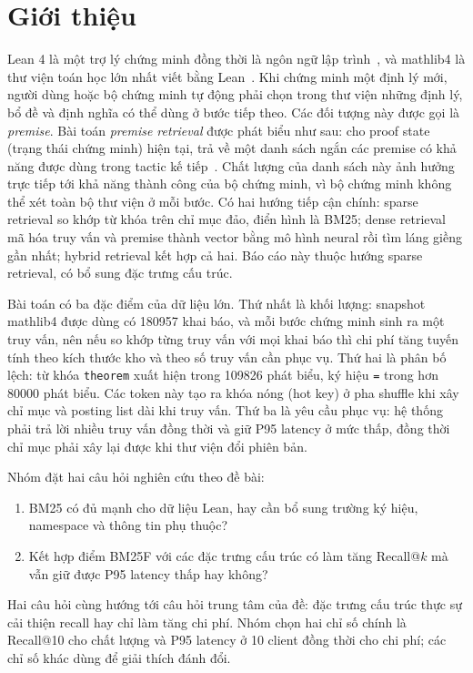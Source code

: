 \documentclass[11pt,a4paper,oneside]{report}
\newcommand{\code}[1]{\texttt{#1}}
\begin{document}
\chapter{Giới thiệu}

Lean 4 là một trợ lý chứng minh đồng thời là ngôn ngữ lập trình~\cite{demoura2021}, và mathlib4 là thư viện toán học
lớn nhất viết bằng Lean~\cite{mathlib2020}. Khi chứng minh một định lý mới, người dùng hoặc bộ chứng minh tự động phải
chọn trong thư viện những định lý, bổ đề và định nghĩa có thể dùng ở bước tiếp theo. Các đối tượng này được gọi là
\emph{premise}. Bài toán \emph{premise retrieval} được phát biểu như sau: cho proof state (trạng thái chứng minh) hiện
tại, trả về một danh sách ngắn các premise có khả năng được dùng trong tactic kế tiếp~\cite{yang2023}. Chất lượng của danh
sách này ảnh hưởng trực tiếp tới khả năng thành công của bộ chứng minh, vì bộ chứng minh không thể xét toàn bộ thư viện ở
mỗi bước. Có hai hướng tiếp cận chính: sparse retrieval so khớp từ khóa trên chỉ mục đảo, điển hình là BM25; dense
retrieval mã hóa truy vấn và premise thành vector bằng mô hình neural rồi tìm láng giềng gần nhất; hybrid retrieval kết
hợp cả hai. Báo cáo này thuộc hướng sparse retrieval, có bổ sung đặc trưng cấu trúc.

Bài toán có ba đặc điểm của dữ liệu lớn. Thứ nhất là khối lượng: snapshot mathlib4 được dùng có \num{180957} khai báo,
và mỗi bước chứng minh sinh ra một truy vấn, nên nếu so khớp từng truy vấn với mọi khai báo thì chi phí tăng tuyến tính
theo kích thước kho và theo số truy vấn cần phục vụ. Thứ hai là phân bố lệch: từ khóa \code{theorem} xuất hiện trong
\num{109826} phát biểu, ký hiệu \code{=} trong hơn \num{80000} phát biểu. Các token này tạo ra khóa nóng (hot key) ở pha
shuffle khi xây chỉ mục và posting list dài khi truy vấn. Thứ ba là yêu cầu phục vụ: hệ thống phải trả lời nhiều truy vấn
đồng thời và giữ P95 latency ở mức thấp, đồng thời chỉ mục phải xây lại được khi thư viện đổi phiên bản.

Nhóm đặt hai câu hỏi nghiên cứu theo đề bài:
\begin{enumerate}[label=\textbf{RQ\arabic*.},leftmargin=*]
  \item BM25 có đủ mạnh cho dữ liệu Lean, hay cần bổ sung trường ký hiệu, namespace và thông tin phụ thuộc?
  \item Kết hợp điểm BM25F với các đặc trưng cấu trúc có làm tăng Recall@$k$ mà vẫn giữ được P95 latency thấp hay không?
\end{enumerate}
Hai câu hỏi cùng hướng tới câu hỏi trung tâm của đề: đặc trưng cấu trúc thực sự cải thiện recall hay chỉ làm tăng chi
phí. Nhóm chọn hai chỉ số chính là Recall@10 cho chất lượng và P95 latency ở 10 client đồng thời cho chi phí; các chỉ số
khác dùng để giải thích đánh đổi.
\end{document}
